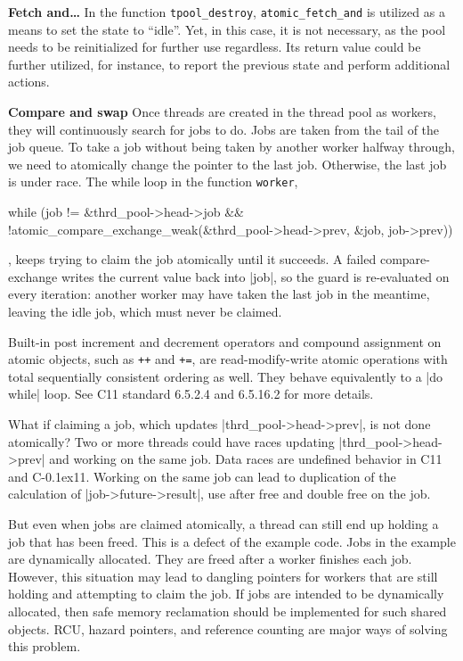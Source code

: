 \documentclass[fontsize=10pt, oneside]{scrartcl}
\newcommand{\monobox}[1]{\mbox{\texttt{#1}}}
\newcommand{\cplusplus}[1]{C\kern-0.1ex\raisebox{0.15ex}{\texttt{++}}}
\newcommand{\clang}[1]{C}
\begin{document}
\textbf{Fetch and…}
In the function \monobox{tpool\_destroy}, \monobox{atomic\_fetch\_and} is utilized as a means to set the state to ``idle''. 
Yet, in this case, it is not necessary, as the pool needs to be reinitialized for further use regardless.
Its return value could be further utilized, for instance, to report the previous state and perform additional actions.

\textbf{Compare and swap}
Once threads are created in the thread pool as workers, they will continuously search for jobs to do.
Jobs are taken from the tail of the job queue.
To take a job without being taken by another worker halfway through, we need to atomically change the pointer to the last job. 
Otherwise, the last job is under race.
The while loop in the function \monobox{worker},
\begin{ccode}
while (job != &thrd_pool->head->job &&
       !atomic_compare_exchange_weak(&thrd_pool->head->prev, &job,
                                     job->prev)) {
}
\end{ccode}
, keeps trying to claim the job atomically until it succeeds.
A failed compare-exchange writes the current value back into \cc|job|,
so the guard is re-evaluated on every iteration:
another worker may have taken the last job in the meantime,
leaving the idle job, which must never be claimed.

Built-in post increment and decrement operators and compound assignment on atomic objects, such as \monobox{++} and \monobox{+=}, are read-modify-write atomic operations with total sequentially consistent ordering as well. 
They behave equivalently to a \cc|do while| loop. See \clang{}11 standard 6.5.2.4 and 6.5.16.2 for more details.

What if claiming a job, which updates \cc|thrd_pool->head->prev|, is not done atomically?
Two or more threads could have races updating \cc|thrd_pool->head->prev| and working on the same job.
Data races are undefined behavior in \clang{}11 and \cplusplus{}11.
Working on the same job can lead to duplication of the calculation of \cc|job->future->result|, 
use after free and double free on the job.

But even when jobs are claimed atomically, a thread can still end up holding a job that has been freed.
This is a defect of the example code.
Jobs in the example are dynamically allocated. They are freed after a worker finishes each job.
However, this situation may lead to dangling pointers for workers that are still holding and attempting to claim the job. 
If jobs are intended to be dynamically allocated, then safe memory reclamation should be implemented for such shared objects.
RCU, hazard pointers, and reference counting are major ways of solving this problem.
\end{document}
